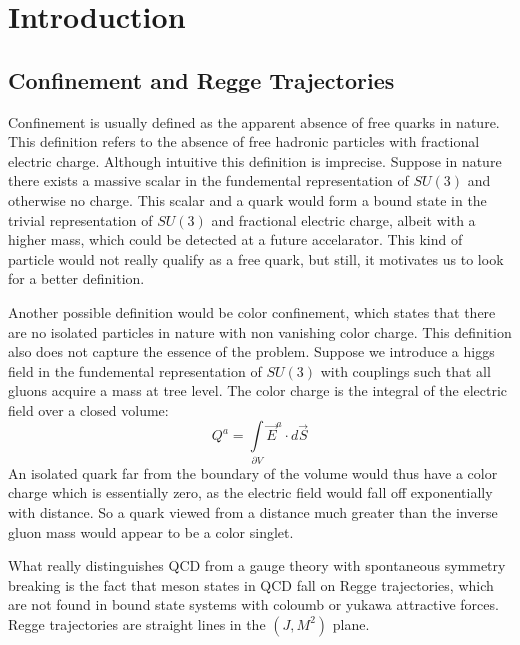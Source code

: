 \documentclass[11pt,a4paper]{article}
\begin{document}
\tableofcontents

\section{Introduction}
\FloatBarrier
\subsection{Confinement and Regge Trajectories}

Confinement\cite{Greensite08} is usually defined as the apparent absence of free quarks in nature. This definition refers to the absence of free hadronic particles with fractional electric charge. Although intuitive this definition is imprecise. Suppose in nature there exists a massive scalar in the fundemental representation of $SU\left(3\right)$ and otherwise no charge. This scalar and a quark would form a bound state in the trivial representation of $SU\left(3\right)$ and fractional electric charge, albeit with a higher mass, which could be detected at a future accelarator. This kind of particle would not really qualify as a free quark, but still, it motivates us to look for a better definition.

Another possible definition would be color confinement, which states that there are no isolated particles in nature with non vanishing color charge. This definition also does not capture the essence of the problem. Suppose we introduce a higgs field in the fundemental representation of $SU\left(3\right)$ with couplings such that all gluons acquire a mass at tree level. The color charge is the integral of the electric field over a closed volume:
\begin{equation}
Q^a=\int\limits_{\partial V} \vec{E}^a \cdot d\vec{S}
\end{equation}
An isolated quark far from the boundary of the volume would thus have a color charge which is essentially zero, as the electric field would fall off exponentially with distance. So a quark viewed from a distance much greater than the inverse gluon mass would appear to be a color singlet.

What really distinguishes QCD from a gauge theory with spontaneous symmetry breaking is the fact that meson states in QCD fall on Regge trajectories, which are not found in bound state systems with coloumb or yukawa attractive forces. Regge trajectories are straight lines in the $\left(J,M^2\right)$ plane.
\end{document}
